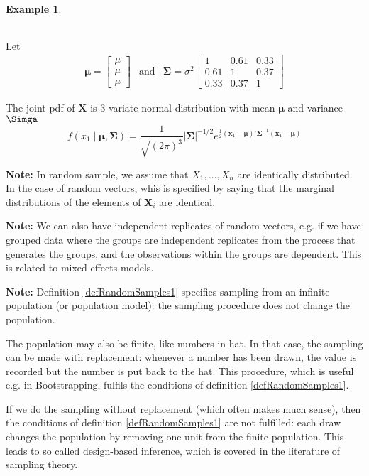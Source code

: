 \documentclass[10pt, twoside, a4paper]{book}
\theoremstyle{definition}
\newtheorem{example}{Example}[chapter]
\begin{document}
\begin{example}
\begin{table}[h]
\begin{tabular}{c|c|c|c}
\end{tabular}
\end{table}
Let
\begin{equation*}
\renewcommand{\arraystretch}{1.6}
\begin{array}{lll}
\bm \mu = \begin{bmatrix} \mu \\ \mu  \\ \mu  \end{bmatrix} &
\text{and} & 
\bm \Sigma = \sigma^2
\begin{bmatrix} 
1 & 0.61 & 0.33 \\ 
0.61 & 1 & 0.37  \\ 
0.33 & 0.37 & 1
\end{bmatrix}
\end{array}
\end{equation*}

The joint pdf of $\bm X$ is 3 variate normal distribution with mean $\bm \mu$
and variance $\bm \Simga $ 
$$f(x_1 \mid \bm \mu, \bm \Sigma) = \frac{1}{\sqrt{(2\pi)^3}}
\lvert \bm \Sigma \rvert^{-1/2}e^{\frac{1}{2}(\bm x_1 - \bm \mu)'\bm \Sigma^{-1}(\bm x_1 - \bm
\mu)}$$
\end{example}
\textbf{Note:} In random sample, we assume that $X_1,\ldots,X_n$ are identically
distributed. In the case of random vectors, whis is specified by saying that the
marginal distributions of the elements of $\bm X_i$ are identical.

\textbf{Note:} We can also have independent replicates of random vectors, e.g.
if we have grouped data where the groups are independent replicates from the
process that generates the groups, and the observations within the groups are
dependent. This is related to mixed-effects models.

\textbf{Note:} Definition \ref{defRandomSamples1} specifies sampling from an
infinite population (or population model): the sampling procedure does not
change the population.

The population may also be finite, like numbers in hat. In that case, the
sampling can be made with replacement: whenever a number has been drawn, the
value is recorded but the number is put back to the hat. This procedure, which
is useful e.g. in Bootstrapping, fulfils the conditions of definition
\ref{defRandomSamples1}.

If we do the sampling without replacement (which often makes much sense), then
the conditions of definition \ref{defRandomSamples1} are not fulfilled: each
draw changes the population by removing one unit from the finite population.
This leads to so called design-based inference, which is covered in the
literature of sampling theory.
\end{document}
